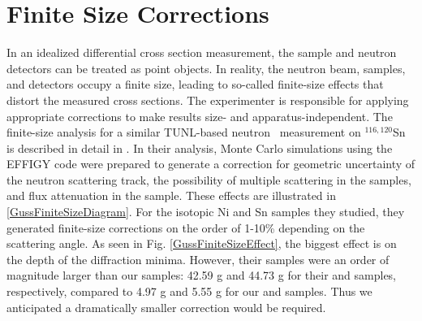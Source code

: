 \section{Finite Size Corrections}
In an idealized differential cross section measurement, the sample and neutron
detectors can be treated as point objects. In reality, the neutron beam,
samples, and detectors occupy a finite size, leading to so-called finite-size
effects that distort the measured cross sections. The experimenter is responsible
for applying appropriate corrections to make results size- and
apparatus-independent. The finite-size analysis for
a similar TUNL-based neutron \el\ measurement on $^{116,120}$Sn is described in detail
in \cite{GussPhDThesis}. In their analysis, Monte Carlo simulations using the
EFFIGY code were
prepared to generate a correction for geometric uncertainty of the neutron
scattering track, the possibility of multiple scattering
in the samples, and flux attenuation in the sample. These effects are illustrated in
\ref{GussFiniteSizeDiagram}.
For the isotopic Ni and Sn samples they studied, they generated finite-size
corrections on the order of 1-10\% depending on the scattering angle. As seen in
Fig. \ref{GussFiniteSizeEffect}, the
biggest effect is on the depth of the diffraction minima.
However, their samples
were an order of magnitude larger than our
samples: 42.59 g and 44.73 g for their \snSixteen and \snTwenty samples,
respectively, compared to 4.97 g and 5.55 g for our \snTwelve and \snFour
samples. Thus we anticipated a dramatically smaller correction would be
required.

